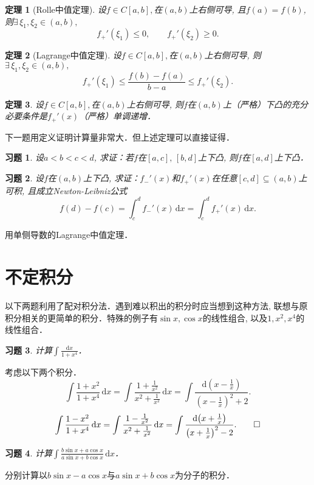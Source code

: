 \documentclass[11pt,a4paper]{ctexart}
\makeatletter
\theoremstyle{thmseries} %
\newtheorem{thm}{定理}[section]
\theoremstyle{exerseries}
\newtheorem{exer}{习题}[section]
\renewenvironment{proof}[1][\proofname]{\par
  \pushQED{\qed}%
  \normalfont \topsep6\p@\@plus6\p@\relax
  \trivlist
  \item[\hskip\labelsep
        \itshape
    #1\@addpunct{}]\ignorespaces
}{%
  \popQED\endtrivlist\@endpefalse
}
\newenvironment{sol}{\begin{proof}[\bfseries\upshape 解\quad]}{\end{proof}}
\newenvironment{pf}{\begin{proof}[\bfseries\upshape 证\quad]}{\end{proof}}
\newcommand{\bra}[1]{\mathopen{}\left(#1\right)}
\renewcommand{\d}{\mathrm{d}}
\makeatother
\begin{document}
\begin{thm}[Rolle中值定理]
	设$f\in C[a,b],$在$(a,b)$上右侧可导, 且$f(a)=f(b)$, 则$\exists\,\xi_1,\xi_2\in(a,b),$
	\[f_+'(\xi_1)\leq0,\qquad f_+'(\xi_2)\geq0.\]
\end{thm}

\begin{thm}[Lagrange中值定理]
	设$f\in C[a,b],$在$(a,b)$上右侧可导, 则$\exists\,\xi_1,\xi_2\in(a,b),$
	\[f_+'(\xi_1)\leq\frac{f(b)-f(a)}{b-a}\leq f_+'(\xi_2).\]
\end{thm}

\begin{thm}
	设$f\in C[a,b],$在$(a,b)$上右侧可导, 则$f$在$(a,b)$上（严格）下凸的充分必要条件是$f_+'(x)$（严格）单调递增．
\end{thm}

下一题用定义证明计算量非常大．但上述定理可以直接证得．
\begin{exer}
	设$a<b<c<d$, 求证：若$f$在$[a,c],\,[b,d]$上下凸, 则$f$在$[a,d]$上下凸．
\end{exer}

\begin{exer}
	设$f$在$(a,b)$上下凸, 求证：$f_-'(x)$和$f_+'(x)$在任意$[c,d]\subseteq(a,b)$上可积, 且成立Newton-Leibniz公式
	\[f(d)-f(c)=\int_{c}^{d}f_-'(x)\,\d x=\int_{c}^{d}f_+'(x)\,\d x.\]
\end{exer}
\begin{pf}
	用单侧导数的Lagrange中值定理．
\end{pf}


\section{不定积分}
以下两题利用了配对积分法．遇到难以积出的积分时应当想到这种方法, 联想与原积分相关的更简单的积分．特殊的例子有$\sin x,\cos x$的线性组合, 以及$1,x^2,x^4$的线性组合．
\begin{exer}
	计算$\int\frac{\d x}{1+x^4}$．
\end{exer}
\begin{sol}
	考虑以下两个积分．
	\[\int\frac{1+x^2}{1+x^4}\,\d x=\int\frac{1+\frac{1}{x^2}}{x^2+\frac{1}{x^2}}\,\d x=\int\frac{\d\bra{x-\frac{1}{x}}}{\bra{x-\frac{1}{x}}^2+2}.\]
	\[\int\frac{1-x^2}{1+x^4}\,\d x=\int\frac{1-\frac{1}{x^2}}{x^2+\frac{1}{x^2}}\,\d x=\int\frac{\d\bra{x+\frac{1}{x}}}{\bra{x+\frac{1}{x}}^2-2}.\qedhere\]
\end{sol}

\begin{exer}
	计算$\int\frac{b\sin x+a\cos x}{a\sin x+b\cos x}\,\d x$．
\end{exer}
\begin{sol}
	分别计算以$b\sin x-a\cos x$与$a\sin x+b\cos x$为分子的积分．
\end{sol}
\end{document}
